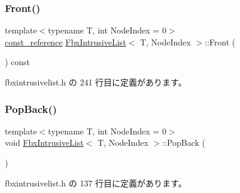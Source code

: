 \mbox{\label{class_fbx_intrusive_list_ae823b1f0c9b7fefde5a5957f852d2d98}} 
\subsubsection{\texorpdfstring{Front()}{Front()}\hspace{0.1cm}{\footnotesize\ttfamily [2/2]}}
{\footnotesize\ttfamily template$<$typename T, int Node\+Index = 0$>$ \\
\hyperlink{class_fbx_intrusive_list_a21904cb72c0ccae9d5c0b9f171befeb8}{const\+\_\+reference} \hyperlink{class_fbx_intrusive_list}{Fbx\+Intrusive\+List}$<$ T, Node\+Index $>$\+::Front (\begin{DoxyParamCaption}{ }\end{DoxyParamCaption}) const\hspace{0.3cm}{\ttfamily [inline]}}



 fbxintrusivelist.\+h の 241 行目に定義があります。

\mbox{\label{class_fbx_intrusive_list_aed150ddaff259ff38993daf555c7a853}} 
\subsubsection{\texorpdfstring{Pop\+Back()}{PopBack()}}
{\footnotesize\ttfamily template$<$typename T, int Node\+Index = 0$>$ \\
void \hyperlink{class_fbx_intrusive_list}{Fbx\+Intrusive\+List}$<$ T, Node\+Index $>$\+::Pop\+Back (\begin{DoxyParamCaption}{ }\end{DoxyParamCaption})\hspace{0.3cm}{\ttfamily [inline]}}



 fbxintrusivelist.\+h の 137 行目に定義があります。

\mbox{\label{class_fbx_intrusive_list_ad332103f8b12b341d38115cd1c5cd3ad}} 
